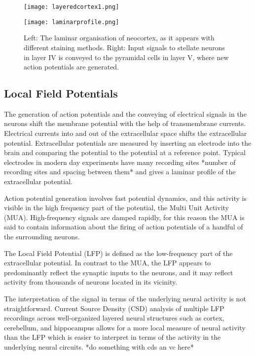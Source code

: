 \documentclass{article}
\begin{document}
\begin{figure}[!tbp]
  \centering
  \begin{minipage}[b]{0.45\textwidth}
    \texttt{[image: layeredcortex1.png]}
  \end{minipage}
  \begin{minipage}[b]{0.45\textwidth}
    \texttt{[image: laminarprofile.png]}
  \end{minipage}  
   \caption{Left: The laminar organisation of neocortex, as it appears with different staining methods. Right: Input signals to stellate neurons in layer IV is conveyed to the pyramidal cells in layer V, where new action potentials are generated.}
  \label{fig:laminarcortex}
\end{figure}



\subsection{Local Field Potentials}\label{Local Field Potentials}
The generation of action potentials and the conveying of electrical signals in the neurons shift the membrane potential with the help of transmembrane currents. Electrical currents into and out of the extracellular space shifts the extracellular potential. Extracellular potentials are measured by inserting an electrode into the brain and comparing the potential to the potential at a reference point. Typical  electrodes  in modern day experiments have many recording sites *number of recording sites and spacing between them* and gives a laminar profile of the extracellular potential. 

Action potential generation involves fast potential dynamics, and this activity is visible in the high frequency part of the potential, the Multi Unit Activity (MUA). High-frequency signals are damped rapidly, for this reason the MUA is said to contain information about the firing of action potentials of a handful of the surrounding neurons. 


The Local Field Potential (LFP) is defined as the low-frequency part of the extracellular potential. In contrast to the MUA, the LFP appears to predominantly reflect the synaptic inputs to the neurons, and it may reflect activity from thousands of
neurons located in its vicinity. 

The interpretation of the signal in terms of the underlying neural activity is not straightforward. Current Source Density (CSD) analysis of multiple LFP recordings across well-organized
layered neural structures such as cortex, cerebellum, and hippocampus allows for a more local measure of neural activity than the LFP which is easier to interpret in terms of the activity in the underlying neural circuits.\cite{EinevollLFP} *do something with cds an vc here*
\end{document}
